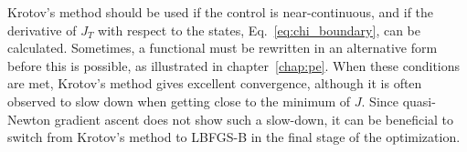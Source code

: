 Krotov's method should be used if the control is near-continuous, and if the
derivative of $J_T$ with respect to the states, Eq.~\eqref{eq:chi_boundary}, can
be calculated. Sometimes, a functional must be rewritten in an alternative form
before this is possible, as illustrated in chapter~\ref{chap:pe}. When these
conditions are met, Krotov's method gives excellent convergence, although it
is often observed to slow down when getting close to the minimum of
$J$. Since quasi-Newton gradient ascent does not show such a slow-down, it can
be beneficial to switch from Krotov's method to LBFGS-B in the final stage of
the optimization.

